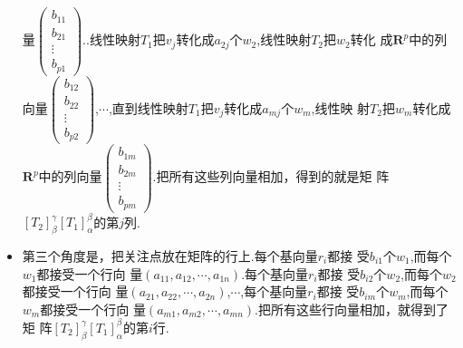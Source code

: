 ﻿\documentclass{book} \usepackage{exsheets} \usepackage{xeCJK}
\begin{document}
\begin{solution}
\begin{itemize}
  量$
  \begin{pmatrix}
    b_{11}\\
    b_{21}\\
    \vdots\\
    b_{p1}
  \end{pmatrix}.
  $.线性映射$T_1$把$v_j$转化成$a_{2j}$个$w_2$,线性映射$T_2$把$w_2$转化
  成$\mathbf{R}^{p}$中的列向量$
  \begin{pmatrix}
    b_{12}\\
    b_{22}\\
    \vdots\\
    b_{p2}
  \end{pmatrix}
  $,$\cdots$,直到线性映射$T_1$把$v_j$转化成$a_{mj}$个$w_m$,线性映
  射$T_2$把$w_m$转化成$\mathbf{R}^{p}$中的列向量$
  \begin{pmatrix}
    b_{1m}\\
    b_{2m}\\
    \vdots\\
    b_{pm}
  \end{pmatrix}.  $把所有这些列向量相加，得到的就是矩
  阵$[T_2]_{\beta}^{\gamma}[T_1]_{\alpha}^{\beta}$的第$j$列.
\item
  第三个角度是，把关注点放在矩阵的行上.每个基向量$r_i$都接
  受$b_{i1}$个$w_1$,而每个$w_1$都接受一个行向
  量$(a_{11},a_{12},\cdots,a_{1n})$.每个基向量$r_i$都接
  受$b_{i2}$个$w_2$,而每个$w_2$都接受一个行向
  量$(a_{21},a_{22},\cdots,a_{2n})$,$\cdots$,每个基向量$r_i$都接
  受$b_{im}$个$w_m$,而每个$w_m$都接受一个行向
  量$(a_{m1},a_{m2},\cdots,a_{mn})$.把所有这些行向量相加，就得到了矩
  阵$[T_2]_{\beta}^{\gamma}[T_1]_{\alpha}^{\beta}$的第$i$行.
\end{itemize}
\end{solution}
\end{document}
